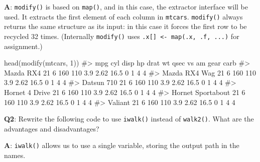 \documentclass[
]{krantz}
\makeatletter
\newenvironment{Shaded}{\begin{snugshade}}{\end{snugshade}}
\newcommand{\CommentTok}[1]{\textcolor[rgb]{0.56,0.35,0.01}{\textit{#1}}}
\newcommand{\DecValTok}[1]{\textcolor[rgb]{0.00,0.00,0.81}{#1}}
\newcommand{\KeywordTok}[1]{\textcolor[rgb]{0.13,0.29,0.53}{\textbf{#1}}}
\newcommand{\NormalTok}[1]{#1}
\newcommand{\OperatorTok}[1]{\textcolor[rgb]{0.81,0.36,0.00}{\textbf{#1}}}
\newcommand{\StringTok}[1]{\textcolor[rgb]{0.31,0.60,0.02}{#1}}
\newenvironment{kframe}{%
\medskip{}
\setlength{\fboxsep}{.8em}
 \def\at@end@of@kframe{}%
 \ifinner\ifhmode%
  \def\at@end@of@kframe{\end{minipage}}%
  \begin{minipage}{\columnwidth}%
 \fi\fi%
 \def\FrameCommand##1{\hskip\@totalleftmargin \hskip-\fboxsep
 \colorbox{shadecolor}{##1}\hskip-\fboxsep
     \hskip-\linewidth \hskip-\@totalleftmargin \hskip\columnwidth}%
 \MakeFramed {\advance\hsize-\width
   \@totalleftmargin\z@ \linewidth\hsize
   \@setminipage}}%
 {\par\unskip\endMakeFramed%
 \at@end@of@kframe}
\renewenvironment{Shaded}{\begin{kframe}}{\end{kframe}}
\renewcommand{\KeywordTok} [1]{\textcolor[rgb]{0.00,0.44,0.13}{{#1}}}
\renewcommand{\DecValTok}  [1]{\textcolor[rgb]{0.25,0.63,0.44}{{#1}}}
\renewcommand{\StringTok}  [1]{\textcolor[rgb]{0.25,0.44,0.63}{{#1}}}
\renewcommand{\CommentTok} [1]{\textcolor[rgb]{0.38,0.63,0.69}{{#1}}}
\renewcommand{\NormalTok}  [1]{{#1}}
\makeatother
\begin{document}
\textbf{{A}}: \texttt{modify()} is based on \texttt{map()}, and in this case, the extractor interface will be used. It extracts the first element of each column in \texttt{mtcars}. \texttt{modify()} always returns the same structure as its input: in this case it forces the first row to be recycled 32 times. (Internally \texttt{modify()} uses \texttt{.x{[}{]}\ \textless{}-\ map(.x,\ .f,\ ...)} for assignment.)

\begin{Shaded}
\begin{Highlighting}[]
\KeywordTok{head}\NormalTok{(}\KeywordTok{modify}\NormalTok{(mtcars, }\DecValTok{1}\NormalTok{))}
\CommentTok{#>                   mpg cyl disp  hp drat   wt qsec vs am gear carb}
\CommentTok{#> Mazda RX4          21   6  160 110  3.9 2.62 16.5  0  1    4    4}
\CommentTok{#> Mazda RX4 Wag      21   6  160 110  3.9 2.62 16.5  0  1    4    4}
\CommentTok{#> Datsun 710         21   6  160 110  3.9 2.62 16.5  0  1    4    4}
\CommentTok{#> Hornet 4 Drive     21   6  160 110  3.9 2.62 16.5  0  1    4    4}
\CommentTok{#> Hornet Sportabout  21   6  160 110  3.9 2.62 16.5  0  1    4    4}
\CommentTok{#> Valiant            21   6  160 110  3.9 2.62 16.5  0  1    4    4}
\end{Highlighting}
\end{Shaded}

\textbf{{Q2}}: Rewrite the following code to use \texttt{iwalk()} instead of \texttt{walk2()}. What are the advantages and disadvantages?

\begin{Shaded}
\end{Shaded}

\textbf{{A}}: \texttt{iwalk()} allows us to use a single variable, storing the output path in the names.

\begin{Shaded}
\end{Shaded}
\end{document}
